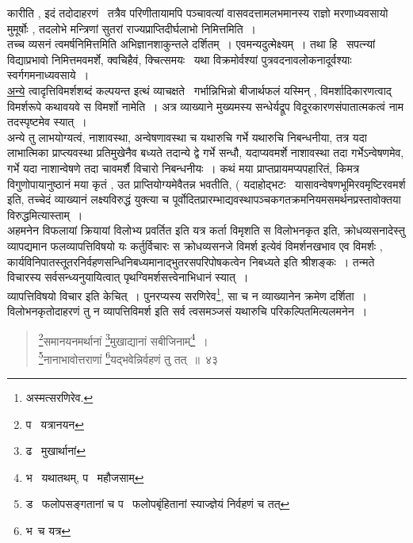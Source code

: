 \documentclass[11pt, openany]{book}
\begin{document}
\newpage

\noindent
कारीति , इदं तदोदाहरणं \textendash\ तत्रैव परिणीतायामपि पञ्चावत्यां वासवदत्तामलभमानस्य राज्ञो मरणाध्यवसायो मुमूर्षोः , तदलोभे मन्त्रिणां सुतरां राज्यप्राप्तिदीर्घलाभो निमित्तमिति~।\\

तच्च व्यसनं त्वमर्षनिमित्तमिति अभिज्ञानशाकुन्तले दर्शितम्~। एवमन्यदुत्मेक्ष्यम्~। तथा हि \textendash\ सपत्न्यां विद्याप्रभावो निमित्तमवमर्शे, क्वचिहैवं, क्चित्समयः \textendash\ यथा विक्रमोर्वश्यां पुत्रवदनावलोकनादूर्वश्याः स्वर्गगमनाध्यवसाये~।\\

\underline{अन्ये} त्वादृत्तिविमर्शशब्दं कल्पयन्त इत्थं व्याचक्षते \textendash\ गर्भान्निभिन्नो बीजार्थफलं यस्मिन् , विमर्शादिकारणत्वाद् विमर्शरूपे कथावयवे स विमर्शो नामेति~। अत्र व्याख्याने मुख्यमस्य सन्धेर्यद्रूप विदूरकारणसंपातात्मकत्वं नाम तदस्पृष्टमेव स्यात्~।\\

अन्ये तु लाभयोग्यत्वं, नाशावस्था, अन्वेषणावस्था च यथारुचि गर्भे यथारुचि निबन्धनीया, तत्र यदा लाभात्मिका प्राप्त्यवस्था प्रतिमुखेनैव बध्यते तदान्ये द्वे गर्भे सन्धौ, यदाप्यवमर्शे नाशावस्था तदा गर्भेऽन्वेषणमेव, गर्भे यदा नाशान्वेषणे तदा चावमर्शै विचारो निबन्धनीयः~। कथं मया प्राप्तप्रायमप्यपहारितं, किमत्र विगुणोपायानुष्ठानं मया कृतं , उत प्राप्तियोग्यमेवैतन्न भवतीति, ( यदाहोद्भटः \textendash\ यासावन्वेषणभूमिरवमृष्टिरवमर्श इति, तच्चेदं व्याख्यानं लक्ष्यविरुद्धं युक्त्या च पूर्वोदितप्रारम्भाद्यवस्थापञ्चकगतक्रमनियमसमर्थनप्रस्तावोक्तया विरुद्धमित्यास्ताम्~।\\

{\qt अहमनेन विफलायां क्रियायां विलोभ्य प्रवर्तित इति यत्र कर्ता विमृशति स विलोभनकृत इति, क्रोधव्यसनादेस्तु व्यापद्यमान फलव्यापत्तिविषयो यः कर्तुर्विचारः स क्रोधव्यसनजे विमर्श इत्येवं विमर्शनखभाव एव विमर्शः , कार्यविनिपातस्तू्तरनिर्वहणसन्धिनिबध्यमानाद्भुतरसपरिपोषकत्वेन निबध्यते} इति श्रीशङ्कः~। तन्मते विचारस्य सर्वसन्ध्यनुयायित्वात् पृथग्विमर्शसत्त्वेनाभिधानं स्यात्~।\\

व्यापत्तिविषयो विचार इति केचित्~। पुनरप्यस्य सरणिरेव\renewcommand{\thefootnote}{1}\footnote{अस्मत्सरणिरेव.}, सा च न व्याख्यानेन क्रमेण दर्शिता~। विलोभनकृतोदाहरणं तु न व्यापत्तिविमर्श इति सर्व त्वसमञ्जसं यथारुचि परिकल्पितमित्यलमनेन~।

\newpage

\begin{quote}
{\na \renewcommand{\thefootnote}{1}\footnote{प \textendash\ यत्रानयन}समानयनमर्थानां \renewcommand{\thefootnote}{2}\footnote{ढ \textendash\ मुखार्थानां}मुखाद्यानां सबीजिनाम्\renewcommand{\thefootnote}{3}\footnote{भ \textendash\ यथातथम्, प \textendash\ महौजसाम्}~।\\
\renewcommand{\thefootnote}{4}\footnote{ड \textendash\ फलोपसङ्गतानां च प \textendash\ फलोपबृंहितानां स्याज्ज्ञेयं निर्वहणं च तत्}नानाभावोत्तराणां \renewcommand{\thefootnote}{5}\footnote{भ\textendash\ च यत्र}यद्भवेन्निर्वहणं तु तत्~॥~४३}
\end{quote}
\end{document}
